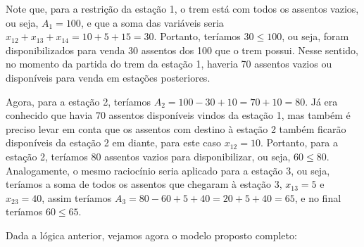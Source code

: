 Note que, para a restrição da estação 1, o trem está com todos os assentos vazios, ou seja, \(A_1=100\), e que a soma das variáveis seria \(x_{12} + x_{13} + x_{14} = 10 + 5 + 15 = 30\). Portanto, teríamos \(30 \leq 100\), ou seja, foram disponibilizados para venda 30 assentos dos 100 que o trem possui. Nesse sentido, no momento da partida do trem da estação 1, haveria 70 assentos vazios ou disponíveis para venda em estações posteriores.

Agora, para a estação 2, teríamos \(A_2 = 100 - 30 + 10 = 70 + 10 = 80\). Já era conhecido que havia 70 assentos disponíveis vindos da estação 1, mas também é preciso levar em conta que os assentos com destino à estação 2 também ficarão disponíveis da estação 2 em diante, para este caso \(x_{12} = 10\). Portanto, para a estação 2, teríamos 80 assentos vazios para disponibilizar, ou seja, \(60 \leq 80\). Analogamente, o mesmo raciocínio seria aplicado para a estação 3, ou seja, teríamos a soma de todos os assentos que chegaram à estação 3, \(x_{13} = 5\) e \(x_{23} = 40\), assim teríamos \(A_3 = 80 - 60 + 5 + 40 = 20 + 5 + 40 = 65\), e no final teríamos \(60 \leq 65\).

Dada a lógica anterior, vejamos agora o modelo proposto completo:

